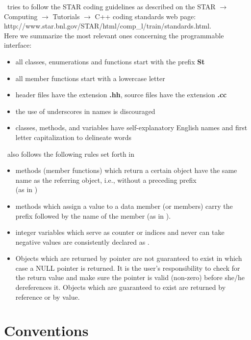 \StMcEvent\ tries to follow the STAR coding guidelines as described on the
STAR $\rightarrow$ Computing $\rightarrow$ Tutorials $\rightarrow$ C++
coding standards web page: \\
http://www.star.bnl.gov/STAR/html/comp\_l/train/standards.html.\\
Here we
summarize the most relevant ones concerning the programmable interface:
\begin{itemize}
\item all classes, enumerations and functions start with the prefix
    \textbf{St}
\item all member functions start with a lowercase letter
\item header files have the extension \textbf{.hh}, source files have
    the extension\textbf{ .cc}
\item the use of underscores in names is discouraged
\item classes, methods, and variables have self-explanatory English
    names and first letter capitalization to delineate words
\end{itemize}

\StMcEvent\ also follows the following rules set forth in \StEvent\ 
\begin{itemize}
\item methods (member functions) which return a certain object have
    the same name as the referring object, i.e., without a preceding
    \name{get} prefix \\ (as in \name{StMcEvent::primaryVertex()})
\item methods which assign a value to a data member (or members) carry
    the prefix \name{set} followed by the name of the member (as in ).
\item integer variables which serve as counter or indices and never
    can take negative values are consistently declared as
    .
\item Objects which are returned by pointer are not guaranteed to
    exist in which case a NULL pointer is returned. It is the user's
    responsibility to check for the return value and make sure the
    pointer is valid (non-zero) before she/he dereferences it.  Objects
    which are guaranteed to exist are returned by reference or by value.
\end{itemize}
\section{Conventions}

